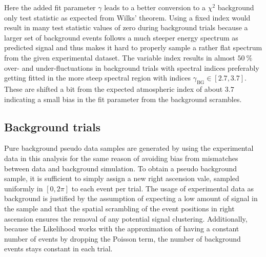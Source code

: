 Here the added fit parameter $\gamma$ leads to a better conversion to a $\chi^2$ background only test statistic as expected from Wilks' theorem.
Using a fixed index would result in many test statistic values of zero during background trials because a larger set of background events follows a much steeper energy spectrum as predicted signal and thus makes it hard to properly sample a rather flat spectrum from the given experimental dataset.
The variable index results in almost $\SI{50}{\percent}$ over- and under-fluctuations in background trials with spectral indices preferably getting fitted in the more steep spectral region with indices $\gamma_\text{BG}\in[2.7, 3.7]$.
These are shifted a bit from the expected atmospheric index of about $\num{3.7}$ indicating a small bias in the fit parameter from the background scrambles.

\subsection*{Background trials}
Pure background pseudo data samples are generated by using the experimental data in this analysis for the same reason of avoiding bias from mismatches between data and background simulation.
To obtain a pseudo background sample, it is sufficient to simply assign a new right ascension vale, sampled uniformly in $[0, 2\pi]$ to each event per trial.
The usage of experimental data as background is justified by the assumption of expecting a low amount of signal in the sample and that the spatial scrambling of the event positions in right ascension ensures the removal of any potential signal clustering.
Additionally, because the Likelihood works with the approximation of having a constant number of events by dropping the Poisson term, the number of background events stays constant in each trial.


